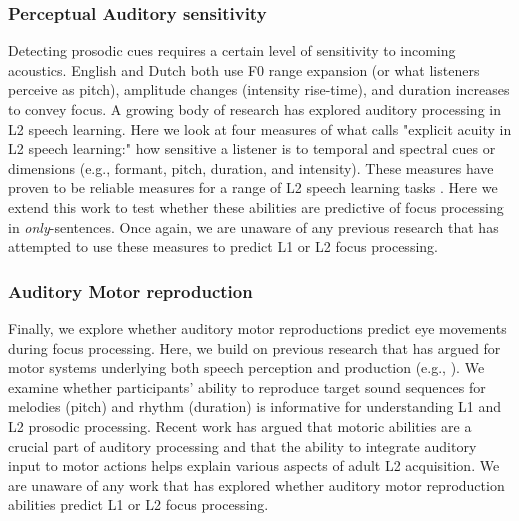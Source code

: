 \subsubsection{Perceptual Auditory sensitivity}
Detecting prosodic cues requires a certain level of sensitivity to incoming acoustics. English and Dutch both use F0 range expansion (or what listeners perceive as pitch), amplitude changes (intensity rise-time), and duration increases to convey focus. A growing body of research has explored auditory processing in L2 speech learning. Here we look at four measures of what \cite{saito2023does} calls "explicit acuity in L2 speech learning:" how sensitive a listener is to temporal and spectral cues or dimensions (e.g., formant,
pitch, duration, and intensity). These measures have proven to be reliable measures for a range of L2 speech learning tasks \citep{Kachlicka_Saito_Tierney_2019, saito2024auditory, bakkouche2025effects, bramlett_wiener_24_speechprosody}. Here we extend this work to test whether these abilities are predictive of focus processing in \textit{only}-sentences. Once again, we are unaware of any previous research that has attempted to use these measures to predict L1 or L2 focus processing.


\subsubsection{Auditory Motor reproduction}
Finally, we explore whether auditory motor reproductions predict eye movements during focus processing. Here, we build on previous research that has argued for motor systems underlying both speech perception and production (e.g., \cite{liberman1985motor,hickok2011sensorimotor}). We examine whether participants' ability to reproduce target sound sequences for melodies (pitch) and rhythm (duration) is informative for understanding L1 and L2 prosodic processing. Recent work \citep{tierney2014auditory, saito2024auditory,tierney2017individual} has argued that motoric abilities are a crucial part of auditory processing and that the ability to integrate auditory input to motor actions helps explain various aspects of adult L2 acquisition. We are unaware of any work that has explored whether auditory motor reproduction abilities predict L1 or L2 focus processing.

